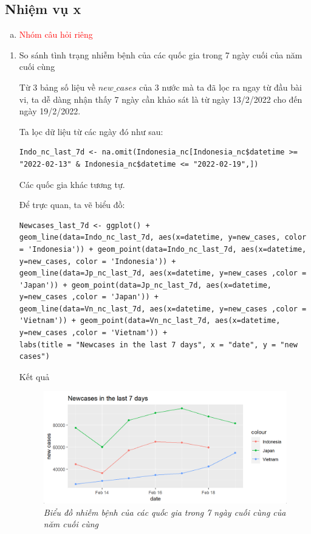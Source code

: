 \documentclass[a4paper]{article}
\theoremstyle{definition}
\begin{document}
    
    
    
    
    
\subsection{Nhiệm vụ x}
\begin{enumerate}[x)]
\item \textcolor{red}{Nhóm câu hỏi riêng}
\end{enumerate}
    \begin{enumerate}[1)]
        \item So sánh tình trạng nhiễm bệnh của các quốc gia trong 7 ngày cuối của năm cuối cùng
    
    	Từ 3 bảng số liệu về $new\_cases$ của 3 nước mà ta đã lọc ra ngay từ đầu bài vi, ta dễ dàng nhận thấy 7 ngày cần khảo sát là từ ngày 13/2/2022 cho đến ngày 19/2/2022.
    	
	Ta lọc dữ liệu từ các ngày đó như sau:
	\begin{lstlisting}
Indo_nc_last_7d <- na.omit(Indonesia_nc[Indonesia_nc$datetime >= "2022-02-13" & Indonesia_nc$datetime <= "2022-02-19",])
	\end{lstlisting}
Các quốc gia khác tương tự.
	
	Để trực quan, ta vẽ biểu đồ:
	\begin{lstlisting}
Newcases_last_7d <- ggplot() +
geom_line(data=Indo_nc_last_7d, aes(x=datetime, y=new_cases, color = 'Indonesia')) + geom_point(data=Indo_nc_last_7d, aes(x=datetime, y=new_cases, color = 'Indonesia')) +
geom_line(data=Jp_nc_last_7d, aes(x=datetime, y=new_cases ,color = 'Japan')) + geom_point(data=Jp_nc_last_7d, aes(x=datetime, y=new_cases ,color = 'Japan')) +
geom_line(data=Vn_nc_last_7d, aes(x=datetime, y=new_cases ,color = 'Vietnam')) + geom_point(data=Vn_nc_last_7d, aes(x=datetime, y=new_cases ,color = 'Vietnam')) +
labs(title = "Newcases in the last 7 days", x = "date", y = "new cases")
	\end{lstlisting}
	
	Kết quả
	\begin{figure}[H]
	    \begin{center}
	    \includegraphics[scale=0.7]{vi/nc_last_7days}
        \vspace{+3mm}\caption{\it Biểu đồ nhiễm bệnh của các quốc gia trong 7 ngày cuối cùng của năm cuối cùng}
	    \end{center}
	\end{figure}
	

\end{enumerate}
\end{document}
